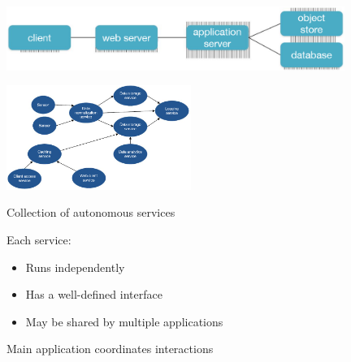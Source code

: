 \begin{slide}

	
	\includegraphics[width=110mm]{multi-tier-example.png}
	
\end{slide}

\begin{slide}
	
	
	\begin{minipage}{0.48\textwidth}
		\includegraphics[width=60mm]{microservice-model.png}
	\end{minipage}
	\hfill
	\begin{minipage}{0.5\textwidth}
		Collection of autonomous services
		\bigskip
		
		Each service:
		\begin{itemize}
			\item Runs independently
			\item Has a well-defined interface
			\item May be shared by multiple applications
		\end{itemize}
		\bigskip
		
		Main application coordinates interactions
	\end{minipage}
	
\end{slide}

